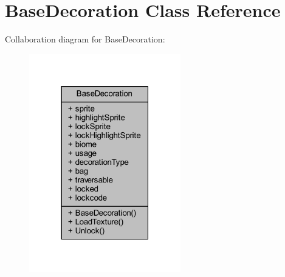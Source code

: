 \hypertarget{class_base_decoration}{}\section{Base\+Decoration Class Reference}
\label{class_base_decoration}


Collaboration diagram for Base\+Decoration\+:
\nopagebreak
\begin{figure}[H]
\begin{center}
\leavevmode
\includegraphics[width=187pt]{class_base_decoration__coll__graph}
\end{center}
\end{figure}
